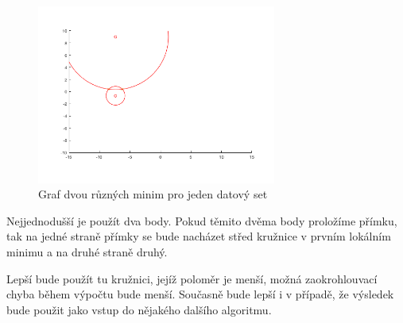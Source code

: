 \begin{figure}[H]
    \centering
    \includegraphics[width=0.7\textwidth]{../2minims.png}
    \caption{Graf dvou různých minim pro jeden datový set}
\end{figure}

Nejjednodušší je použít dva body. Pokud těmito dvěma body proložíme přímku, tak na jedné straně přímky se bude nacházet střed kružnice v prvním lokálním minimu a na druhé straně druhý.

Lepší bude použít tu kružnici, jejíž poloměr je menší, možná zaokrohlouvací chyba během výpočtu bude menší. Současně bude lepší i v případě, že výsledek bude použit jako vstup do nějakého dalšího algoritmu.
